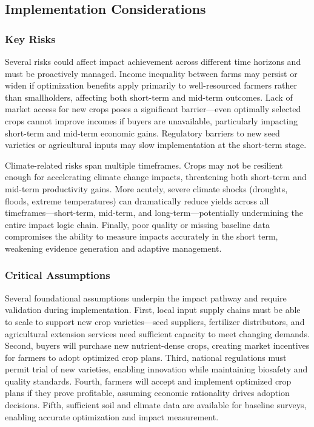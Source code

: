 \documentclass{oqireport}
\begin{document}
\subsection{Implementation Considerations}

\subsubsection{Key Risks}

Several risks could affect impact achievement across different time horizons and must be proactively managed. Income inequality between farms may persist or widen if optimization benefits apply primarily to well-resourced farmers rather than smallholders, affecting both short-term and mid-term outcomes. Lack of market access for new crops poses a significant barrier—even optimally selected crops cannot improve incomes if buyers are unavailable, particularly impacting short-term and mid-term economic gains. Regulatory barriers to new seed varieties or agricultural inputs may slow implementation at the short-term stage.

Climate-related risks span multiple timeframes. Crops may not be resilient enough for accelerating climate change impacts, threatening both short-term and mid-term productivity gains. More acutely, severe climate shocks (droughts, floods, extreme temperatures) can dramatically reduce yields across all timeframes—short-term, mid-term, and long-term—potentially undermining the entire impact logic chain. Finally, poor quality or missing baseline data compromises the ability to measure impacts accurately in the short term, weakening evidence generation and adaptive management.

\subsubsection{Critical Assumptions}

Several foundational assumptions underpin the impact pathway and require validation during implementation. First, local input supply chains must be able to scale to support new crop varieties—seed suppliers, fertilizer distributors, and agricultural extension services need sufficient capacity to meet changing demands. Second, buyers will purchase new nutrient-dense crops, creating market incentives for farmers to adopt optimized crop plans. Third, national regulations must permit trial of new varieties, enabling innovation while maintaining biosafety and quality standards. Fourth, farmers will accept and implement optimized crop plans if they prove profitable, assuming economic rationality drives adoption decisions. Fifth, sufficient soil and climate data are available for baseline surveys, enabling accurate optimization and impact measurement.
\end{document}
